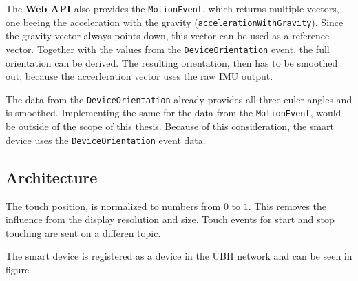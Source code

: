 The \textbf{Web API} also provides the \lstinline{MotionEvent}, which returns multiple vectors, one beeing the acceleration with the gravity (\lstinline{accelerationWithGravity}). Since the gravity vector always points down, this vector can be used as a reference vector. Together with the values from the \lstinline{DeviceOrientation} event, the full orientation can be derived. The resulting orientation, then has to be smoothed out, because the accerleration vector uses the raw \ac{IMU} output. 

The data from the \lstinline{DeviceOrientation} already provides all three euler angles and is smoothed. Implementing the same for the data from the \lstinline{MotionEvent}, would be outside of the scope of this thesis. Because of this consideration, the smart device uses the \lstinline{DeviceOrientation} event data.

\subsection{Architecture}\label{subsection:architecture}

The touch position, is normalized to numbers from $0$ to $1$. This removes the influence from the display resolution and size. Touch events for start and stop touching are sent on a differen topic. 

The smart device is registered as a device in the \ac{UBII} network and can be seen in figure %




